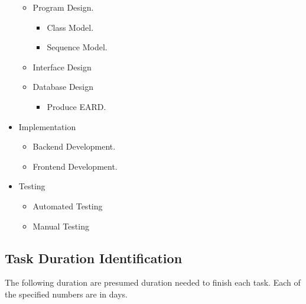\begin{justify}
\begin{itemize}[itemsep=-0.4cm]
\begin{itemize}[itemsep=-0.3cm]
                \item Program Design. \vspace{-0.3cm}
                    \begin{itemize}[itemsep=-0.3cm]
                        \item Class Model.
                        \item Sequence Model.
                    \end{itemize}
                \item Interface Design
                \item Database Design \vspace{-0.3cm}
                    \begin{itemize}[itemsep=-0.3cm]
                        \item Produce EARD.
                    \end{itemize}
            \end{itemize}
        \item Implementation \vspace{-0.35cm}
            \begin{itemize}[itemsep=-0.3cm]
                \item Backend Development.
                \item Frontend Development.
            \end{itemize}
        \item Testing \vspace{-0.35cm}
            \begin{itemize}[itemsep=-0.3cm]
                \item Automated Testing
                \item Manual Testing \\
            \end{itemize}
    \end{itemize}
\end{justify}

\subsection{Task Duration Identification}
\begin{justify}
The following duration are presumed duration needed to finish each task. Each of the specified numbers are in days.
\end{justify}

